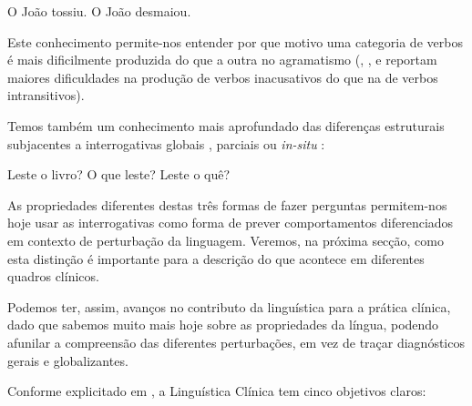 \documentclass[output=paper,colorlinks,citecolor=brown,booklanguage=portuguese]{langscibook}
\begin{document}
\ea
    \ea\label{ex:cap2ex12a} O João tossiu.
    \ex\label{ex:cap2ex12b} O João desmaiou.
    \z
\z

Este conhecimento permite-nos entender por que motivo uma categoria de verbos é mais dificilmente produzida do que a outra no agramatismo (\citet{Kegl1985}, \citet{Grodzinsky1995}, \citet{Beretta2001}  e \citet{Thompson2003} reportam maiores dificuldades na produção de verbos inacusativos do que na de verbos intransitivos).

Temos também um conhecimento mais aprofundado das diferenças estruturais subjacentes a interrogativas globais , parciais  ou \emph{in-situ} :

\ea
        \ea\label{ex:cap2ex13a} Leste o livro?
        \ex\label{ex:cap2ex13b} O que leste?
        \ex\label{ex:cap2ex13c} Leste o quê?
    \z
\z

As propriedades diferentes destas três formas de fazer perguntas per\-mi\-tem-nos hoje usar as interrogativas como forma de prever comportamentos diferenciados em contexto de perturbação da linguagem. Veremos, na próxima secção, como esta distinção é importante para a descrição do que acontece em diferentes quadros clínicos. 

Podemos ter, assim, avanços no contributo da linguística para a prática clínica, dado que sabemos muito mais hoje sobre as propriedades da língua, podendo afunilar a compreensão das diferentes perturbações, em vez de traçar diagnósticos gerais e globalizantes.

Conforme explicitado em \citet{Costa2016}, a Linguística Clínica tem cinco objetivos claros:
\end{document}
